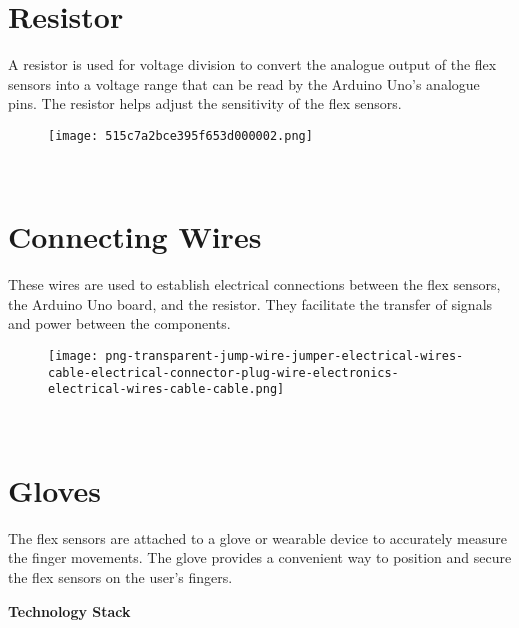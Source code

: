 \documentclass[a4paper,12pt,oneside]{report}
\begin{document}
 \section{Resistor}
 A resistor is used for voltage division to convert the
analogue output of the flex sensors into a voltage range that can be read
by the Arduino Uno's analogue pins. The resistor helps adjust the
sensitivity of the flex sensors.
\begin{figure}[h]
    \centering
    \begin{minipage}{0.5\textwidth}
        \centering
        \texttt{[image: 515c7a2bce395f653d000002.png]}
        \label{fig:flex-sensor}
    \end{minipage}
\end{figure}
\\
 
 \section{Connecting Wires}
These wires are used to establish electrical
connections between the flex sensors, the Arduino Uno board, and the
resistor. They facilitate the transfer of signals and power between the
components.
\begin{figure}[h]
    \centering
    \begin{minipage}{0.5\textwidth}
        \centering
        \texttt{[image: png-transparent-jump-wire-jumper-electrical-wires-cable-electrical-connector-plug-wire-electronics-electrical-wires-cable-cable.png]}
        \label{fig:flex-sensor}
    \end{minipage}
\end{figure}
\\


 \section{Gloves}
The flex sensors are attached to a glove or wearable device to
accurately measure the finger movements. The glove provides a
convenient way to position and secure the flex sensors on the user's fingers.    



\vspace{\baselineskip}
\vspace{\baselineskip}

\textbf{\huge Technology Stack}
\end{document}
